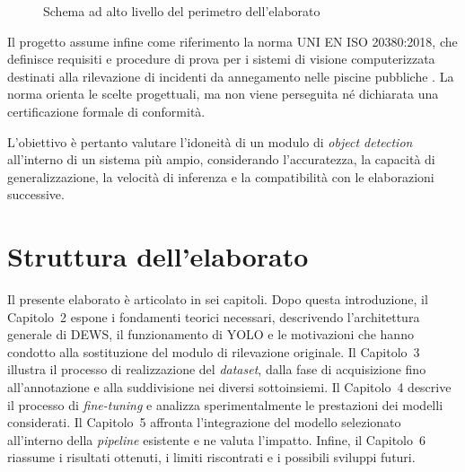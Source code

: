 \begin{figure}[htbp]
    \centering
    \caption[Perimetro dell'elaborato]{Schema ad alto livello del perimetro dell'elaborato}
    \label{fig:perimetro-elaborato}
\end{figure}

Il progetto assume infine come riferimento la norma UNI EN ISO 20380:2018, che definisce requisiti e procedure di prova per i sistemi di visione computerizzata destinati alla rilevazione di incidenti da annegamento nelle piscine pubbliche \cite{UNI20380}. La norma orienta le scelte progettuali, ma non viene perseguita né dichiarata una certificazione formale di conformità.

L'obiettivo è pertanto valutare l'idoneità di un modulo di \emph{object detection} all'interno di un sistema più ampio, considerando l'accuratezza, la capacità di generalizzazione, la velocità di inferenza e la compatibilità con le elaborazioni successive.

\section{Struttura dell'elaborato}

Il presente elaborato è articolato in sei capitoli. Dopo questa introduzione, il Capitolo~2 espone i fondamenti teorici necessari, descrivendo l'architettura generale di DEWS, il funzionamento di YOLO e le motivazioni che hanno condotto alla sostituzione del modulo di rilevazione originale. Il Capitolo~3 illustra il processo di realizzazione del \emph{dataset}, dalla fase di acquisizione fino all'annotazione e alla suddivisione nei diversi sottoinsiemi. Il Capitolo~4 descrive il processo di \emph{fine-tuning} e analizza sperimentalmente le prestazioni dei modelli considerati. Il Capitolo~5 affronta l'integrazione del modello selezionato all'interno della \emph{pipeline} esistente e ne valuta l'impatto. Infine, il Capitolo~6 riassume i risultati ottenuti, i limiti riscontrati e i possibili sviluppi futuri.
